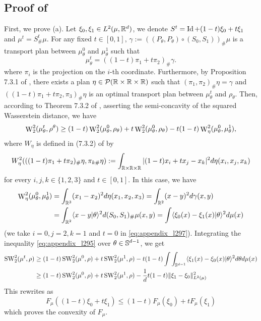 \subsection{Proof of \texorpdfstring{}{}} \label{sec:proof_sw2_diff}

First, we prove (a). Let $\xi_0,\xi_1 \in L^2(\mu,\mathbb R^d)$, we denote $S^t = \mathop{\mathrm{Id}}\nolimits + (1-t)\xi_0 + t\xi_1$ and $\mu^t = S^t_{\#}\mu$. For any fixed $t\in [0,1]$,  $\gamma := ((P_\theta,P_\theta) \circ (S_0,S_1))_\#\mu$ is a transport plan between $\mu^0_\theta$ and $\mu^1_\theta$ such that 
\begin{equation} \mu^t_\theta = ((1-t)\pi_1 + t\pi_2)_{\#} \gamma.\end{equation}
where $\pi_i$ is the projection on the $i$-th coordinate. Furthermore, by Proposition 7.3.1 of \cite{ambrosio2005gradient}, there exists a plan $\eta \in \mathcal{P}(\mathbb R \times \mathbb R \times \mathbb R)$ such that $(\pi_1,\pi_2)_\#\eta = \gamma$ and $((1-t)\pi_1+t\pi_2,\pi_3)_\#\eta$ is an optimal transport plan between $\mu^t_\theta$ and $\rho_\theta$. Then, according to Theorem 7.3.2 of \cite{ambrosio2005gradient}, asserting the semi-concavity of the squared Wasserstein distance, we have
\begin{equation} \label{eq:appendix_l295}
    \mathop{\mathrm{W}}\nolimits_2^2(\mu^t_\theta,\rho^\theta) \geq (1-t)\mathop{\mathrm{W}}\nolimits_2^2(\mu^0_\theta,\rho_\theta) + t\mathop{\mathrm{W}}\nolimits_2^2(\mu^0_\theta,\rho_\theta) - t(1-t)\mathop{\mathrm{W}}\nolimits_{\eta}^2(\mu^0_\theta,\mu^1_\theta),
\end{equation}
where $W_\eta$ is defined in (7.3.2) of \cite{ambrosio2005gradient} by
\begin{equation} \label{eq:appendix_l297}
    W^2_\eta(((1-t)\pi_1 + t\pi_2)_\#\eta,\pi_{k\#}\eta) := \int_{\mathbb R \times \mathbb R \times \mathbb R} |(1-t)x_i + tx_j - x_k|^2 d\eta(x_i,x_j,x_k)
\end{equation}
for every $i,j,k \in \{1,2,3\}$ and $t \in [0,1]$. In this case, we have
\begin{align}
    \mathop{\mathrm{W}}\nolimits_{\eta}^2(\mu^0_\theta,\mu^1_\theta) &= \int_{\mathbb R^3} (x_1 - x_2)^2 d\eta(x_1,x_2,x_3) = \int_{\mathbb R^2} (x-y)^2 d\gamma(x,y) \\
    &= \int_{\mathbb R^2} \langle x - y|\theta\rangle^2 d(S_0,S_1)_{\#}\mu(x,y) = \int \langle\xi_0(x) - \xi_1(x)|\theta\rangle^2 d\mu(x)
\end{align}
(we take $i=0,j=2,k=1$ and $t=0$ in \eqref{eq:appendix_l297}). Integrating the inequality \eqref{eq:appendix_l295} over $\theta \in \mathbb S^{d-1}$, we get 
\begin{align}
    \mathop{\mathrm{SW}}\nolimits_2^2(\mu^t,\rho) 
    &\geq (1-t)\mathop{\mathrm{SW}}\nolimits_2^2(\mu^0,\rho) + t \mathop{\mathrm{SW}}\nolimits_2^2(\mu^1,\rho) -  t(1-t)\int \int_{\mathbb S^{d-1}}\langle\xi_1(x) - \xi_0(x)|\theta\rangle^2  d\theta d\mu(x) \\
    &\geq (1-t)\mathop{\mathrm{SW}}\nolimits_2^2(\mu^0,\rho) + t \mathop{\mathrm{SW}}\nolimits_2^2(\mu^1,\rho) -  \frac{1}{d} t(1-t)\|\xi_1 - \xi_0\|^2_{L^2(\mu)}
\end{align}
This rewrites as
\begin{equation} F_\mu((1-t)\xi_0 + t\xi_1) \leq (1-t) F_\mu(\xi_0) + t F_\mu(\xi_1) \end{equation}
which proves the convexity of $F_\mu$. \newline

